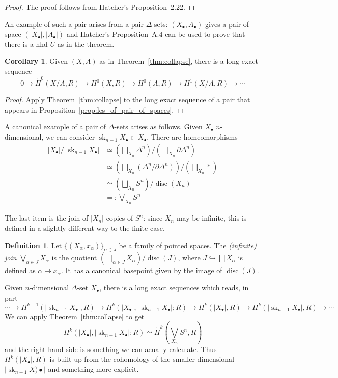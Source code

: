 \documentclass{tufte-handout}
\def\into {\hookrightarrow}
\DeclareMathOperator{\disc}{disc}
\DeclareMathOperator{\sk}{sk}
\theoremstyle{definition}
\newtheorem{definition}{Definition}
\newtheorem{corollary}{Corollary}
\begin{document}
\begin{proof}
The proof follows from Hatcher's Proposition~2.22.
\end{proof}

An example of such a pair arises from a pair $\Delta$-sets: $(X_\bullet,A_\bullet)$ gives a pair of space $(|X_\bullet|,|A_\bullet|)$ and Hatcher's Proposition~A.4 can be used to prove that there is a nhd $U$ as in the theorem.

\begin{corollary}
Given $(X,A)$ as in Theorem~\ref{thm:collapse}, there is a long exact sequence
\[
0\to \widetilde{H}^0(X/A,R) \to H^0(X,R) \to H^0(A,R) \to H^1(X/A,R) \to \cdots
\]
\end{corollary}

\begin{proof}
Apply Theorem~\ref{thm:collapse} to the long exact sequence of a pair that appears in Proposition~\ref{prop:les_of_pair_of_spaces}.
\end{proof}

A canonical example of a pair of $\Delta$-sets arises as follows. Given $X_\bullet$ $n$-dimensional, we can consider $\sk_{n-1}X_\bullet \subset X_\bullet$. There are homeomorphisms
\begin{align*}
|X_\bullet|/|\sk_{n-1}X_\bullet| 
& \simeq \left(\bigsqcup_{X_n} \Delta^n\right)\big/\left(\bigsqcup_{X_n}\partial\Delta^n\right)\\
& \simeq \left(\bigsqcup_{X_n}(\Delta^n/\partial\Delta^n)\right)\big/\left(\bigsqcup_{X_n}\ast\right)\\
& \simeq \left(\bigsqcup_{X_n} S^n\right)/\disc(X_n)\\
& =: \bigvee_{X_n} S^n
\end{align*}

The last item is the join of $|X_n|$ copies of $S^n$: since $X_n$ may be infinite, this is defined in a slightly different way to the finite case.

\begin{definition}
Let $\{(X_\alpha,x_\alpha)\}_{\alpha\in J}$ be a family of pointed spaces. The \emph{(infinite) join} $\bigvee_{\alpha\in J} X_\alpha$ is the quotient $\left(\bigsqcup_{\alpha\in J} X_\alpha\right)/\disc(J)$, where $J\into \bigsqcup X_\alpha$ is defined as $\alpha \mapsto x_\alpha$. It has a canonical basepoint given by the image of $\disc(J)$.
\end{definition}


Given $n$-dimensional $\Delta$-set $X_\bullet$, there is a long exact sequences which reads, in part
\[
\cdots \to H^{k-1}(|\sk_{n-1}X_\bullet|,R) \to H^k(|X_\bullet|,|\sk_{n-1}X_\bullet|;R) \to H^k(|X_\bullet|,R) \to H^k(|\sk_{n-1}X_\bullet|,R) \to \cdots 
\]
We can apply Theorem~\ref{thm:collapse} to get 
\[
	H^k(|X_\bullet|,|\sk_{n-1}X_\bullet|;R) \simeq \widetilde{H}^k(\bigvee_{X_n}S^n,R)
\]
and the right hand side is something we can acually calculate. Thus $H^k(|X_\bullet|,R)$ is built up from the cohomology of the smaller-dimensional $|\sk_{n-1}X)\bullet|$ and something more explicit.
\end{document}
